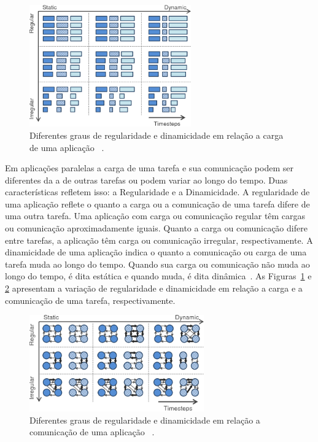 \documentclass[
	12pt,				%
	openright,			%
	twoside,			%
	a4paper,			%
	english,			%
	brazil,				%
	]{abntex2}
\begin{document}
\begin{figure} [b]
\includegraphics[width=0.62\textwidth]{load_pilla}
\centering
\caption[Diferentes graus de regularidade e dinamicidade em relação a carga de uma aplicação.]{Diferentes graus de regularidade e dinamicidade em relação a carga de uma aplicação ~\cite{pilla-thesis}.}
\label{fig:load}
\end{figure}

Em aplicações paralelas a carga de uma tarefa e sua comunicação podem ser diferentes da a de outras tarefas ou podem variar ao longo do tempo. 
Duas características refletem isso: a Regularidade e a Dinamicidade. 
A regularidade de uma aplicação reflete o quanto a carga ou a comunicação de uma tarefa difere de uma outra tarefa. Uma aplicação com carga ou comunicação regular têm cargas ou comunicação aproximadamente iguais. 
Quanto a carga ou comunicação difere entre tarefas, a aplicação têm carga ou comunicação irregular, respectivamente.
A dinamicidade de uma aplicação indica o quanto a comunicação ou carga de uma tarefa muda ao longo do tempo. Quando sua carga ou comunicação não muda ao longo do tempo, é dita estática e quando muda, é dita dinâmica~\cite{pilla-thesis}.
As Figuras~\ref{fig:load} e \ref{fig:communication} apresentam a variação de regularidade e dinamicidade em relação a carga e a comunicação de uma tarefa, respectivamente. 

\begin{figure} [h]
\includegraphics[width=0.67\textwidth]{comm_pilla}
\centering
\caption[Diferentes graus de regularidade e dinamicidade em relação a comunicação de uma aplicação.]{Diferentes graus de regularidade e dinamicidade em relação a comunicação de uma aplicação ~\cite{pilla-thesis}.}
\label{fig:communication}
\end{figure}
\end{document}
